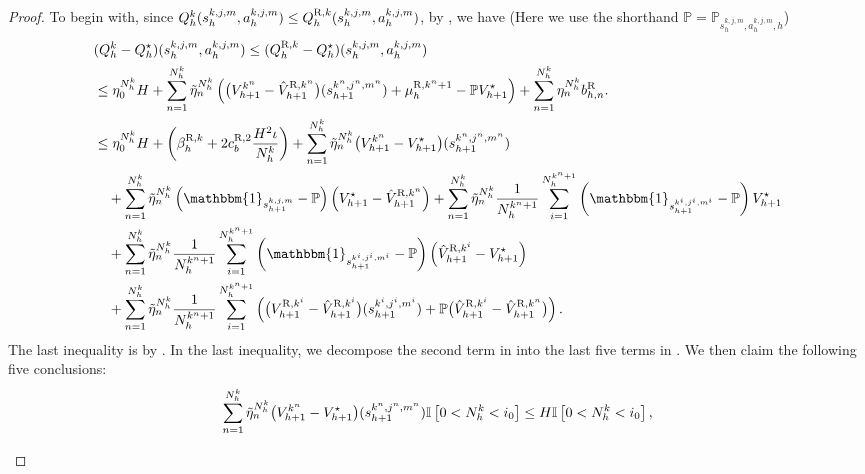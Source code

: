 \documentclass{article}
\newcommand{\R}{\textnormal{R}}
\begin{document}
\begin{proof}
    To begin with, since $Q_h^{k} (s_h^{k,j,m}, a_h^{k,j,m}) \leq Q_h^{\R,k} (s_h^{k,j,m}, a_h^{k,j,m})$, by , we have (Here we use the shorthand $\mathbb{P} = \mathbb{P}_{s_h^{k,j,m}, a_h^{k,j,m},h}$)
    \begin{align}
        &(Q_h^{k} - Q_h^{\star})(s_h^{k,j,m}, a_h^{k,j,m}) \leq (Q_h^{\R,k} - Q_h^{\star})(s_h^{k,j,m}, a_h^{k,j,m}) \nonumber\\
        &\leq \eta_0^{N_h^k}H + \sum_{n=1}^{N_h^k} \Tilde{\eta}_n^{N_h^k} \left( \big(V_{h+1}^{k^n}-\hat{V}_{h+1}^{\R,k^n}\big)(s_{h+1}^{k^n,j^n,m^n})   + \mu_h^{\R,k^n+1}- \mathbb{P} V_{h+1}^{\star}\right) + \sum_{n=1}^{N_h^k} \eta_n^{N_h^k}b_{h,n}^{\R}. \label{Rstardivide}\\
        &\leq \eta_0^{N_h^k}H +  \left(\beta_{h}^{\R,k} + 2c_b^{\R,2}\frac{H^2\iota}{N_h^k}\right)+\sum_{n=1}^{N_h^k} \Tilde{\eta}_n^{N_h^k}  \big(V_{h+1}^{k^n}-V_{h+1}^{\star}\big)(s_{h+1}^{k^n,j^n,m^n})\nonumber\\
        &\quad +\sum_{n=1}^{N_h^k} \Tilde{\eta}_n^{N_h^k}\left(\mathbbm{1}_{s_{h+1}^{k,j,m}}-\mathbb{P}\right)\left(V_{h+1}^{\star}-\hat{V}_{h+1}^{\R,k^n}\right) +\sum_{n=1}^{N_h^k} \Tilde{\eta}_n^{N_h^k}\frac{1}{N_h^{k^n+1}} \sum_{i=1}^{N_h^{k^n+1}}\left(\mathbbm{1}_{s_{h+1}^{k^i,j^i,m^i}}-\mathbb{P}\right)V_{h+1}^{\star} \nonumber\\
        & \quad+ \sum_{n=1}^{N_h^k} \Tilde{\eta}_n^{N_h^k}\frac{1}{N_h^{k^n+1}} \sum_{i=1}^{N_h^{k^n+1}}\left(\mathbbm{1}_{s_{h+1}^{k^i,j^i,m^i}}-\mathbb{P}\right)\left(\hat{V}_{h+1}^{\R,k^i}-V_{h+1}^{\star}\right) \nonumber\\
        &\quad +\sum_{n=1}^{N_h^k} \Tilde{\eta}_n^{N_h^k}\frac{1}{N_h^{k^n+1}} \sum_{i=1}^{N_h^{k^n+1}}\left(\big(V_{h+1}^{\R,k^i}-\hat{V}_{h+1}^{\R,k^i}\big)(s_{h+1}^{k^i,j^i,m^i})+\mathbb{P}\big(\hat{V}_{h+1}^{\R,k^i}-\hat{V}_{h+1}^{\R,k^n}\big)\right). \label{Rstarbegin}
    \end{align}
The last inequality is by . In the last inequality, we decompose the second term in  into the last five terms in . We then claim the following five conclusions:
\begin{align*}
    \sum_{n=1}^{N_h^k} \Tilde{\eta}_n^{N_h^k}  \big(V_{h+1}^{k^n}-V_{h+1}^{\star}\big)(s_{h+1}^{k^n,j^n,m^n})\mathbb{I}\left[0<N_h^k<i_0 \right] \leq H\mathbb{I}\left[0<N_h^k <i_0 \right],
\end{align*}
\begin{align*}

\end{align*}
\end{proof}
\end{document}
